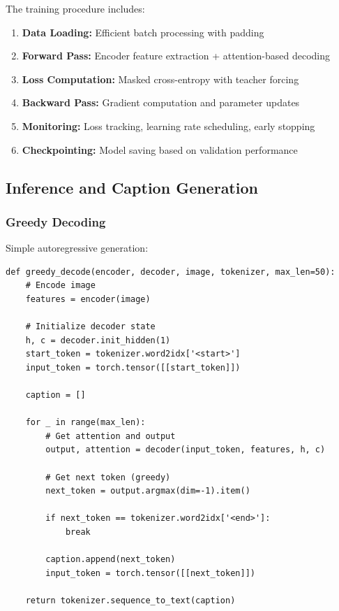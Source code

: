 \documentclass[conference]{IEEEtran}
\begin{document}
The training procedure includes:
\begin{enumerate}
  \item \textbf{Data Loading:} Efficient batch processing with padding
  \item \textbf{Forward Pass:} Encoder feature extraction + attention-based decoding
  \item \textbf{Loss Computation:} Masked cross-entropy with teacher forcing
  \item \textbf{Backward Pass:} Gradient computation and parameter updates
  \item \textbf{Monitoring:} Loss tracking, learning rate scheduling, early stopping
  \item \textbf{Checkpointing:} Model saving based on validation performance
\end{enumerate}

\subsection{Inference and Caption Generation}
\label{sec:q1_inference}

\subsubsection{Greedy Decoding}
\label{sec:q1_greedy}

Simple autoregressive generation:
\begin{lstlisting}
def greedy_decode(encoder, decoder, image, tokenizer, max_len=50):
    # Encode image
    features = encoder(image)

    # Initialize decoder state
    h, c = decoder.init_hidden(1)
    start_token = tokenizer.word2idx['<start>']
    input_token = torch.tensor([[start_token]])

    caption = []

    for _ in range(max_len):
        # Get attention and output
        output, attention = decoder(input_token, features, h, c)

        # Get next token (greedy)
        next_token = output.argmax(dim=-1).item()

        if next_token == tokenizer.word2idx['<end>']:
            break

        caption.append(next_token)
        input_token = torch.tensor([[next_token]])

    return tokenizer.sequence_to_text(caption)
\end{lstlisting}
\end{document}
